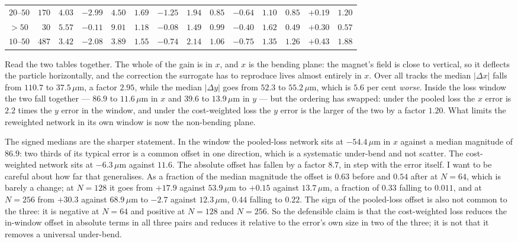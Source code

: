 \documentclass[11pt,a4paper]{article}
\newcommand{\um}{\ensuremath{\,\mu\mathrm{m}}}
\begin{document}
\begin{table}[tbp]
\begin{tabular}{lrrrrrrrrrrrrr}
    $20$--$50$ & $170$  & $4.03$ & $-2.99$ & $4.50$  & $1.69$ & $-1.25$ & $1.94$ & $0.85$  & $-0.64$ & $1.10$  & $0.85$  & $+0.19$ & $1.20$ \\
    $>50$      & $30$   & $5.57$ & $-0.11$ & $9.01$  & $1.18$ & $-0.08$ & $1.49$ & $0.99$  & $-0.40$ & $1.62$  & $0.49$  & $+0.30$ & $0.57$ \\
    $10$--$50$ & $487$  & $3.42$ & $-2.08$ & $3.89$  & $1.55$ & $-0.74$ & $2.14$ & $1.06$  & $-0.75$ & $1.35$  & $1.26$  & $+0.43$ & $1.88$ \\
    \bottomrule
  \end{tabular}
\end{table}

Read the two tables together. The whole of the gain is in $x$, and $x$ is the
bending plane: the magnet's field is close to vertical, so it deflects the
particle horizontally, and the correction the surrogate has to reproduce lives
almost entirely in $x$. Over all tracks the median $|\Delta x|$ falls from
$110.7$ to $37.5\um$, a factor $2.95$, while the median $|\Delta y|$ goes from
$52.3$ to $55.2\um$, which is $5.6$ per cent \emph{worse}. Inside the loss
window the two fall together --- $86.9$ to $11.6\um$ in $x$ and $39.6$ to
$13.9\um$ in $y$ --- but the ordering has swapped: under the pooled loss the
$x$ error is $2.2$ times the $y$ error in the window, and under the
cost-weighted loss the $y$ error is the larger of the two by a factor $1.20$.
What limits the reweighted network in its own window is now the non-bending
plane.

The signed medians are the sharper statement. In the window the pooled-loss
network sits at $-54.4\um$ in $x$ against a median magnitude of $86.9$: two
thirds of its typical error is a common offset in one direction, which is a
systematic under-bend and not scatter. The cost-weighted network sits at
$-6.3\um$ against $11.6$. The absolute offset has fallen by a factor $8.7$,
in step with the error itself. I want to be careful about how far that
generalises. As a fraction of the median magnitude the offset is $0.63$ before
and $0.54$ after at $N = 64$, which is barely a change; at $N = 128$ it goes
from $+17.9$ against $53.9\um$ to $+0.15$ against $13.7\um$, a fraction of
$0.33$ falling to $0.011$, and at $N = 256$ from $+30.3$ against $68.9\um$ to
$-2.7$ against $12.3\um$, $0.44$ falling to $0.22$. The sign of the pooled-loss
offset is also not common to the three: it is negative at $N = 64$ and positive
at $N = 128$ and $N = 256$. So the defensible claim is that the cost-weighted
loss reduces the in-window offset in absolute terms in all three pairs and
reduces it relative to the error's own size in two of the three; it is not that
it removes a universal under-bend.
\end{document}
